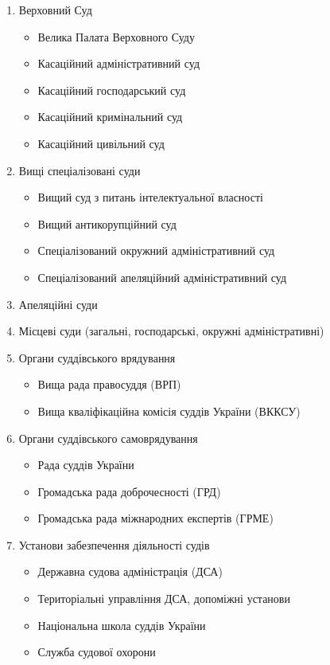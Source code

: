 \begin{enumerate}
    \item Верховний Суд
    \begin{itemize}
        \item Велика Палата Верховного Суду
        \item Касаційний адміністративний суд
        \item Касаційний господарський суд
        \item Касаційний кримінальний суд
        \item Касаційний цивільний суд
    \end{itemize}
    \item Вищі спеціалізовані суди
    \begin{itemize}
        \item Вищий суд з питань інтелектуальної власності
        \item Вищий антикорупційний суд
        \item Спеціалізований окружний адміністративний суд
        \item Спеціалізований апеляційний адміністративний суд
    \end{itemize}
    \item Апеляційні суди
    \item Місцеві суди (загальні, господарські, окружні адміністративні)
    \item Органи суддівського врядування
    \begin{itemize}
        \item Вища рада правосуддя (ВРП)
        \item Вища кваліфікаційна комісія суддів України (ВККСУ)
    \end{itemize}
    \item Органи суддівського самоврядування
    \begin{itemize}
        \item Рада суддів України
        \item Громадська рада доброчесності (ГРД)
        \item Громадська рада міжнародних експертів (ГРМЕ)
    \end{itemize}
    \item Установи забезпечення діяльності судів
    \begin{itemize}
        \item Державна судова адміністрація (ДСА)
        \item Територіальні управління ДСА, допоміжні установи
        \item Національна школа суддів України
        \item Служба судової охорони
    \end{itemize}
\end{enumerate}

